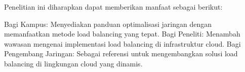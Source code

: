Penelitian ini diharapkan dapat memberikan manfaat sebagai berikut:

    Bagi Kampus: Menyediakan panduan optimalisasi jaringan dengan memanfaatkan metode load balancing yang tepat.
    Bagi Peneliti: Menambah wawasan mengenai implementasi load balancing di infrastruktur cloud.
    Bagi Pengembang Jaringan: Sebagai referensi untuk mengembangkan solusi load balancing di lingkungan cloud yang dinamis.
